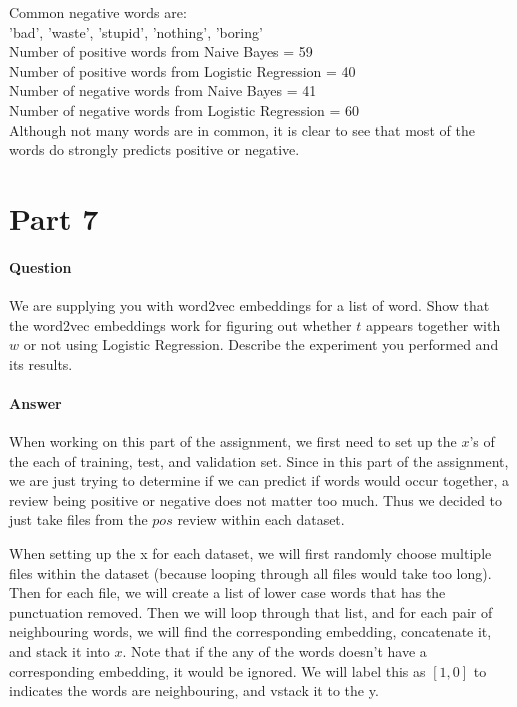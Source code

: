 \documentclass[11pt,twoside]{article}
\begin{document}
Common negative words are:\\
{'bad', 'waste', 'stupid', 'nothing', 'boring'}\\

Number of positive words from Naive Bayes = 59\\
Number of positive words from Logistic Regression = 40\\
Number of negative words from Naive Bayes = 41\\
Number of negative words from Logistic Regression = 60\\

Although not many words are in common, it is clear to see that most of the words do strongly predicts positive or negative.
\clearpage

\section*{Part 7}
\paragraph{Question}
We are supplying you with word2vec embeddings for a list of word. Show that the word2vec embeddings work for figuring out whether $t$ appears together with $w$ or not using Logistic Regression. Describe the experiment you performed and its results.

\paragraph{Answer}
When working on this part of the assignment, we first need to set up the $x$'s of the each of training, test, and validation set. Since in this part of the assignment, we are just trying to determine if we can predict if words would occur together, a review being positive or negative does not matter too much. Thus we decided to just take files from the $pos$ review within each dataset.

When setting up the x for each dataset, we will first randomly choose multiple files within the dataset (because looping through all files would take too long). Then for each file, we will create a list of lower case words that has the punctuation removed. Then we will loop through that list, and for each pair of neighbouring words, we will find the corresponding embedding, concatenate it, and stack it into $x$. Note that if the any of the words doesn't have a corresponding embedding, it would be ignored. We will label this as $[1, 0]$ to indicates the words are neighbouring, and vstack it to the y.
\end{document}
